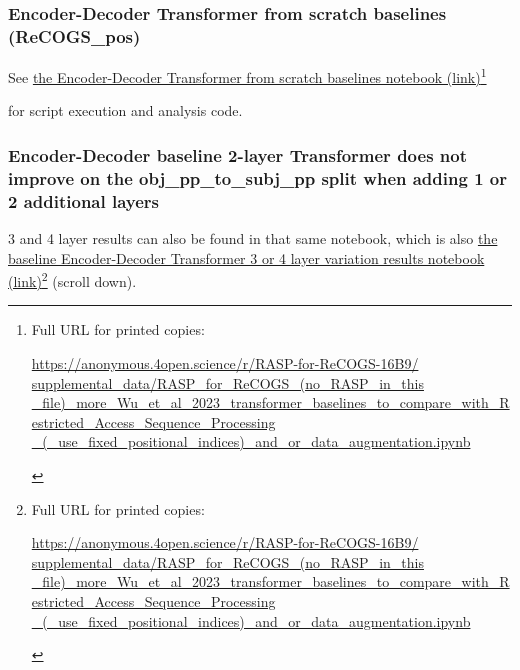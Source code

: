 \documentclass[11pt]{article}
\begin{document}
\subsubsection{\cite{Wu2023} Encoder-Decoder Transformer from scratch baselines (ReCOGS\_pos)}

See \href{https://anonymous.4open.science/r/RASP-for-ReCOGS-16B9/supplemental\_data/RASP\_for\_ReCOGS\_(no\_RASP\_in\_this\_file)\_more\_Wu\_et\_al\_2023\_transformer\_baselines\_to\_compare\_with\_Restricted\_Access\_Sequence\_Processing\_(\_use\_fixed\_positional\_indices)\_and\_or\_data\_augmentation.ipynb}{the Encoder-Decoder Transformer from scratch baselines notebook (link)}\footnote{\begin{footnotesize}Full URL for printed copies: 

\href{https://anonymous.4open.science/r/RASP-for-ReCOGS-16B9/supplemental\_data/RASP\_for\_ReCOGS\_(no\_RASP\_in\_this\_file)\_more\_Wu\_et\_al\_2023\_transformer\_baselines\_to\_compare\_with\_Restricted\_Access\_Sequence\_Processing\_(\_use\_fixed\_positional\_indices)\_and\_or\_data\_augmentation.ipynb}{https://anonymous.4open.science/r/RASP-for-ReCOGS-16B9/
supplemental\_data/RASP\_for\_ReCOGS\_(no\_RASP\_in\_this
\_file)\_more\_Wu\_et\_al\_2023\_transformer\_baselines\_to\_compare\_with\_Restricted\_Access\_Sequence\_Processing
\_(\_use\_fixed\_positional\_indices)\_and\_or\_data\_augmentation.ipynb}\end{footnotesize}}

for \cite{Wu2023} script execution and analysis code.

\subsubsection{\cite{Wu2023} Encoder-Decoder baseline 2-layer Transformer does not improve on the obj\_pp\_to\_subj\_pp split when adding 1 or 2 additional layers}

3 and 4 layer results can also be found in that same notebook, which is also \href{https://anonymous.4open.science/r/RASP-for-ReCOGS-16B9/supplemental\_data/RASP\_for\_ReCOGS\_(no\_RASP\_in\_this\_file)\_more\_Wu\_et\_al\_2023\_transformer\_baselines\_to\_compare\_with\_Restricted\_Access\_Sequence\_Processing\_(\_use\_fixed\_positional\_indices)\_and\_or\_data\_augmentation.ipynb}{the baseline Encoder-Decoder Transformer 3 or 4 layer variation results notebook (link)}\footnote{\begin{footnotesize}Full URL for printed copies: 

\href{https://anonymous.4open.science/r/RASP-for-ReCOGS-16B9/supplemental\_data/RASP\_for\_ReCOGS\_(no\_RASP\_in\_this\_file)\_more\_Wu\_et\_al\_2023\_transformer\_baselines\_to\_compare\_with\_Restricted\_Access\_Sequence\_Processing\_(\_use\_fixed\_positional\_indices)\_and\_or\_data\_augmentation.ipynb}{https://anonymous.4open.science/r/RASP-for-ReCOGS-16B9/
supplemental\_data/RASP\_for\_ReCOGS\_(no\_RASP\_in\_this
\_file)\_more\_Wu\_et\_al\_2023\_transformer\_baselines\_to\_compare\_with\_Restricted\_Access\_Sequence\_Processing
\_(\_use\_fixed\_positional\_indices)\_and\_or\_data\_augmentation.ipynb}\end{footnotesize}} (scroll down).
\end{document}
